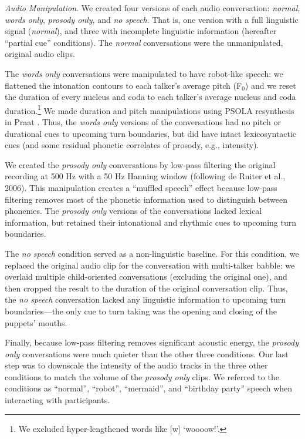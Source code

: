 \documentclass[authoryear, 12pt]{elsarticle}
\begin{document}
\textit{Audio Manipulation}. We created four versions of each audio conversation: \textit{normal}, \textit{words only}, \textit{prosody only}, and \textit{no speech}. That is, one version with a full linguistic signal (\textit{normal}), and three with incomplete linguistic information (hereafter ``partial cue'' conditions). The \textit{normal} conversations were the unmanipulated, original audio clips.

The \textit{words only} conversations were manipulated to have robot-like speech: we flattened the intonation contours to each talker's average pitch (F$_{0}$) and we reset the duration of every nucleus and coda to each talker's average nucleus and coda duration.\footnote{We excluded hyper-lengthened words like [w] `woooow!'.} We made duration and pitch manipulations using PSOLA resynthesis in Praat \citep{Praat}. Thus, the \textit{words only} versions of the conversations had no pitch or durational cues to upcoming turn boundaries, but did have intact lexicosyntactic cues (and some residual phonetic correlates of prosody, e.g., intensity).

We created the \textit{prosody only} conversations by low-pass filtering the original recording at 500 Hz with a 50 Hz Hanning window (following de Ruiter et al., 2006). This manipulation creates a ``muffled speech'' effect because low-pass filtering removes most of the phonetic information used to distinguish between phonemes. The \textit{prosody only} versions of the conversations lacked lexical information, but retained their intonational and rhythmic cues to upcoming turn boundaries.

The \textit{no speech} condition served as a non-linguistic baseline. For this condition, we replaced the original audio clip for the conversation with multi-talker babble: we overlaid multiple child-oriented conversations (excluding the original one), and then cropped the result to the duration of the original conversation clip. Thus, the \textit{no speech} conversation lacked any linguistic information to upcoming turn boundaries---the only cue to turn taking was the opening and closing of the puppets' mouths.

Finally, because low-pass filtering removes significant acoustic energy, the \textit{prosody only} conversations were much quieter than the other three conditions. Our last step was to downscale the intensity of the audio tracks in the three other conditions to match the volume of the \textit{prosody only} clips. We referred to the conditions as ``normal'', ``robot'', ``mermaid'', and ``birthday party'' speech when interacting with participants.
\end{document}
